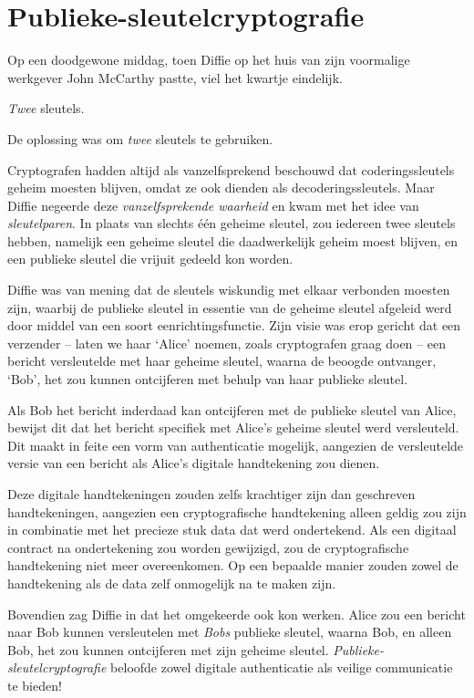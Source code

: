 \documentclass[
  a5paper,
  smalldemyvopaper,11pt,twoside,onecolumn,openright,extrafontsizes,
hidelinks]{memoir}
\begin{document}
\section{Publieke-sleutelcryptografie}\label{publieke-sleutelcryptografie}

Op een doodgewone middag, toen Diffie op het huis van zijn voormalige
werkgever John McCarthy pastte, viel het kwartje eindelijk.

\emph{Twee} sleutels.

De oplossing was om \emph{twee} sleutels te gebruiken.

Cryptografen hadden altijd als vanzelfsprekend beschouwd dat
coderingssleutels geheim moesten blijven, omdat ze ook dienden als
decoderingssleutels. Maar Diffie negeerde deze \emph{vanzelfsprekende
waarheid} en kwam met het idee van \emph{sleutelparen}. In plaats van
slechts één geheime sleutel, zou iedereen twee sleutels hebben, namelijk
een geheime sleutel die daadwerkelijk geheim moest blijven, en een
publieke sleutel die vrijuit gedeeld kon worden.

Diffie was van mening dat de sleutels wiskundig met elkaar verbonden
moesten zijn, waarbij de publieke sleutel in essentie van de geheime
sleutel afgeleid werd door middel van een soort eenrichtingsfunctie.
Zijn visie was erop gericht dat een verzender -- laten we haar `Alice'
noemen, zoals cryptografen graag doen -- een bericht versleutelde met
haar geheime sleutel, waarna de beoogde ontvanger, `Bob', het zou kunnen
ontcijferen met behulp van haar publieke sleutel.

Als Bob het bericht inderdaad kan ontcijferen met de publieke sleutel
van Alice, bewijst dit dat het bericht specifiek met Alice's geheime
sleutel werd versleuteld. Dit maakt in feite een vorm van authenticatie
mogelijk, aangezien de versleutelde versie van een bericht als Alice's
digitale handtekening zou dienen.

Deze digitale handtekeningen zouden zelfs krachtiger zijn dan geschreven
handtekeningen, aangezien een cryptografische handtekening alleen geldig
zou zijn in combinatie met het precieze stuk data dat werd ondertekend.
Als een digitaal contract na ondertekening zou worden gewijzigd, zou de
cryptografische handtekening niet meer overeenkomen. Op een bepaalde
manier zouden zowel de handtekening als de data zelf onmogelijk na te
maken zijn.

Bovendien zag Diffie in dat het omgekeerde ook kon werken. Alice zou een
bericht naar Bob kunnen versleutelen met \emph{Bobs} publieke sleutel,
waarna Bob, en alleen Bob, het zou kunnen ontcijferen met zijn geheime
sleutel. \emph{Publieke-sleutelcryptografie} beloofde zowel digitale
authenticatie als veilige communicatie te bieden!
\end{document}
